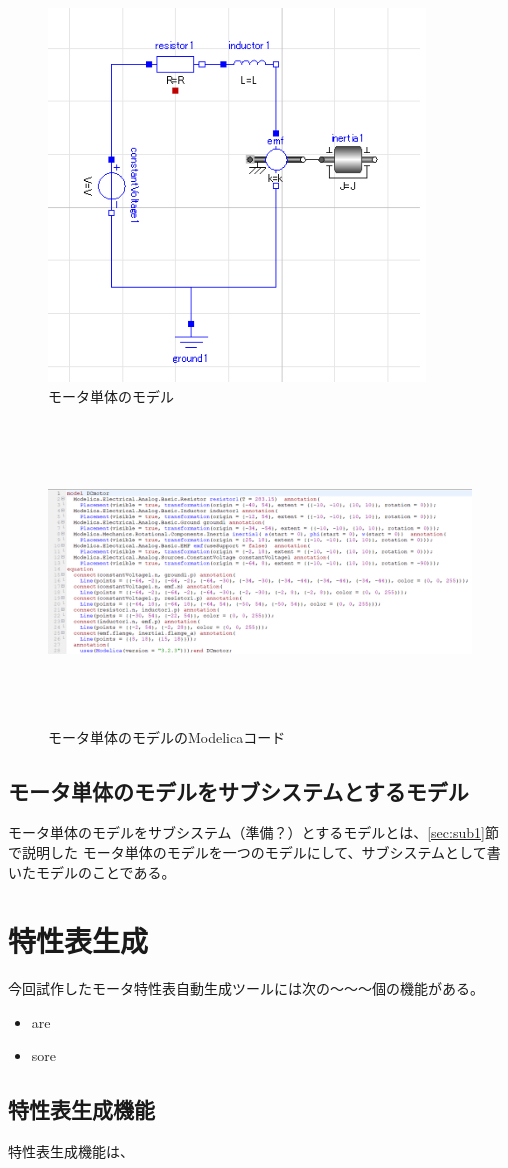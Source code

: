\begin{figure}[t]
  \centering
  \includegraphics[width=10cm]{./Image/tantai_model.png}
  \caption{モータ単体のモデル}
  \label{fig:tantai_model}
\end{figure}

\begin{figure}[t]
	\centering
	\includegraphics[width=16.5cm,height=8cm]{./Image/tantai_modelica.png}
	\caption{モータ単体のモデルのModelicaコード}
	\label{fig:tantai_modelica}
  \end{figure}

\subsection{モータ単体のモデルをサブシステムとするモデル}\label{sec:sub2}
モータ単体のモデルをサブシステム\cite{modelicaシステム本}（準備？）とするモデルとは、\ref{sec:sub1}節で説明した
モータ単体のモデルを一つのモデルにして、サブシステムとして書いたモデルのことである。


\section{特性表生成}\label{kenkyu_mokuteki}
今回試作したモータ特性表自動生成ツールには次の～～～個の機能がある。

\begin{itemize}
	\item are
	\item sore 
\end{itemize}

\subsection{特性表生成機能}\label{sec:tokusei}
特性表生成機能は、

